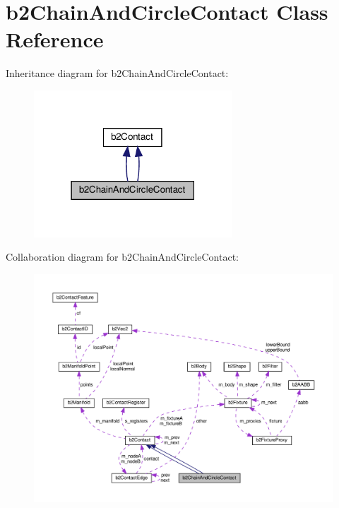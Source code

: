 \hypertarget{classb2ChainAndCircleContact}{}\section{b2\+Chain\+And\+Circle\+Contact Class Reference}
\label{classb2ChainAndCircleContact}


Inheritance diagram for b2\+Chain\+And\+Circle\+Contact\+:
\nopagebreak
\begin{figure}[H]
\begin{center}
\leavevmode
\includegraphics[width=210pt]{classb2ChainAndCircleContact__inherit__graph}
\end{center}
\end{figure}


Collaboration diagram for b2\+Chain\+And\+Circle\+Contact\+:
\nopagebreak
\begin{figure}[H]
\begin{center}
\leavevmode
\includegraphics[width=350pt]{classb2ChainAndCircleContact__coll__graph}
\end{center}
\end{figure}
